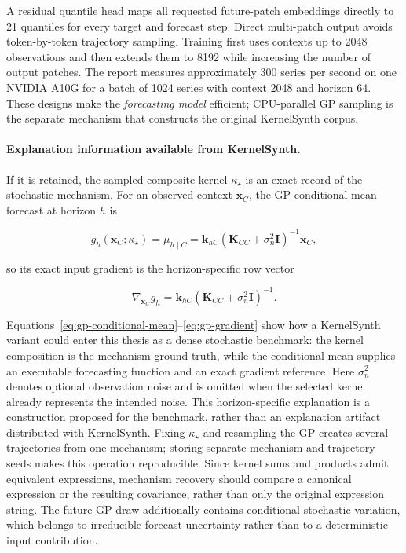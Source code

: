 A residual quantile head maps all requested future-patch embeddings directly
to 21 quantiles for every target and forecast step. Direct multi-patch output
avoids token-by-token trajectory sampling. Training first uses contexts up to
2048 observations and then extends them to 8192 while increasing the number of
output patches. The report measures approximately 300 series per second on one
NVIDIA A10G for a batch of 1024 series with context 2048 and horizon 64. These
designs make the \emph{forecasting model} efficient; CPU-parallel GP sampling
is the separate mechanism that constructs the original KernelSynth corpus.

\paragraph{Explanation information available from KernelSynth.}
If it is retained, the sampled composite kernel $\kappa_\star$ is an exact
record of the stochastic mechanism. For an observed context $\mathbf x_C$,
the GP conditional-mean forecast at horizon $h$ is

\begin{equation}
g_h(\mathbf x_C;\kappa_\star)
=\mu_{h\mid C}
=\mathbf k_{hC}
  (\mathbf K_{CC}+\sigma_n^2\mathbf I)^{-1}\mathbf x_C,
\label{eq:gp-conditional-mean}
\end{equation}

so its exact input gradient is the horizon-specific row vector

\begin{equation}
\nabla_{\mathbf x_C}g_h
=\mathbf k_{hC}
 (\mathbf K_{CC}+\sigma_n^2\mathbf I)^{-1}.
\label{eq:gp-gradient}
\end{equation}

Equations~\eqref{eq:gp-conditional-mean}--\eqref{eq:gp-gradient} show how a
KernelSynth variant could enter this thesis as a dense stochastic benchmark:
the kernel composition is the mechanism ground truth, while the conditional
mean supplies an executable forecasting function and an exact gradient
reference. Here $\sigma_n^2$ denotes optional observation noise and is omitted
when the selected kernel already represents the intended noise. This
horizon-specific explanation is a construction proposed for the benchmark,
rather than an explanation artifact distributed with KernelSynth. Fixing
$\kappa_\star$ and resampling the GP creates several trajectories from one
mechanism; storing separate mechanism and trajectory seeds makes this operation
reproducible. Since kernel sums and products admit equivalent expressions,
mechanism recovery should compare a canonical expression or the resulting
covariance, rather than only the original expression string. The future GP
draw additionally contains conditional stochastic variation, which belongs to
irreducible forecast uncertainty rather than to a deterministic input
contribution.

